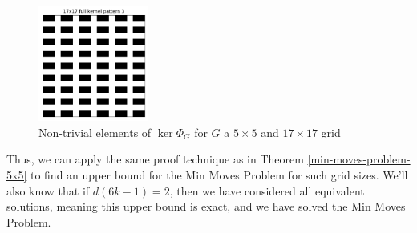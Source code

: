 \documentclass[a4paper]{article}
\begin{document}
\begin{figure}[H]
		\includegraphics[width=0.32\textwidth]{../../code/serialization/kernels/17x17/full/17x17_kernel_full_3.png}
		\caption{Non-trivial elements of $\ker{\Phi_G}$ for $G$ a $5 \times 5$ and $17 \times 17$ grid}
	\end{figure}
	
	Thus, we can apply the same proof technique as in Theorem \ref{min-moves-problem-5x5} to find an upper bound for the Min Moves Problem for such grid sizes.
	We'll also know that if $d(6k - 1) = 2$, then we have considered all equivalent solutions, meaning this upper bound is exact, and we have solved the Min Moves Problem.
	
\end{document}

